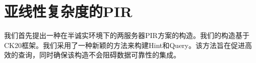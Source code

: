 \chapter{亚线性复杂度的PIR}


我们首先提出一种在半诚实环境下的两服务器PIR方案的构造。我们的构造基于CK20\cite{EC:CorKog20}框架。我们采用了一种新颖的方法来构建Hint和Query。该方法旨在促进高效的查询，同时确保该构造不会阻碍数据可靠性的集成。










